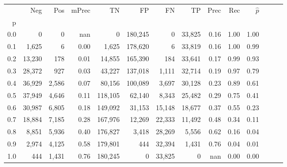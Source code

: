 \begin{tabular}{rrrrrrrrrrrrrr}
\toprule
{} &     Neg &    Pos & mPrec &       TN &       FP &      FN &      TP &  Prec &   Rec & $\hat{p}$ \\
p   &         &        &       &          &          &         &         &       &       &           \\
\midrule
0.0 &       0 &      0 &   nan &        0 &  180,245 &       0 &  33,825 &  0.16 &  1.00 &      1.00 \\
0.1 &   1,625 &      6 &  0.00 &    1,625 &  178,620 &       6 &  33,819 &  0.16 &  1.00 &      0.99 \\
0.2 &  13,230 &    178 &  0.01 &   14,855 &  165,390 &     184 &  33,641 &  0.17 &  0.99 &      0.93 \\
0.3 &  28,372 &    927 &  0.03 &   43,227 &  137,018 &   1,111 &  32,714 &  0.19 &  0.97 &      0.79 \\
0.4 &  36,929 &  2,586 &  0.07 &   80,156 &  100,089 &   3,697 &  30,128 &  0.23 &  0.89 &      0.61 \\
0.5 &  37,949 &  4,646 &  0.11 &  118,105 &   62,140 &   8,343 &  25,482 &  0.29 &  0.75 &      0.41 \\
0.6 &  30,987 &  6,805 &  0.18 &  149,092 &   31,153 &  15,148 &  18,677 &  0.37 &  0.55 &      0.23 \\
0.7 &  18,884 &  7,185 &  0.28 &  167,976 &   12,269 &  22,333 &  11,492 &  0.48 &  0.34 &      0.11 \\
0.8 &   8,851 &  5,936 &  0.40 &  176,827 &    3,418 &  28,269 &   5,556 &  0.62 &  0.16 &      0.04 \\
0.9 &   2,974 &  4,125 &  0.58 &  179,801 &      444 &  32,394 &   1,431 &  0.76 &  0.04 &      0.01 \\
1.0 &     444 &  1,431 &  0.76 &  180,245 &        0 &  33,825 &       0 &   nan &  0.00 &      0.00 \\
\bottomrule
\end{tabular}
